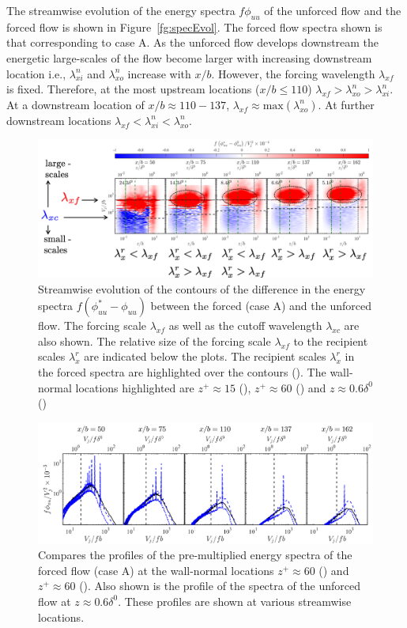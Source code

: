 The streamwise evolution of the energy spectra $f\phi_{uu}$ of the unforced flow and the forced flow is shown in Figure~\ref{fg:specEvol}. The forced flow spectra shown is that corresponding to case A. As the unforced flow develops downstream the energetic large-scales of the flow become larger with increasing downstream location i.e., $\lambda_{xi}^n$ and $\lambda_{xo}^n$ increase with $x/b$. However, the forcing wavelength $\lambda_{xf}$ is fixed. Therefore, at the most upstream locations ($x/b\leq 110$) $\lambda_{xf}>\lambda_{xo}^n>\lambda_{xi}^n$. At a downstream location of $x/b\approx 110-137$, $\lambda_{xf}\approx \mathrm{max}\left(\lambda_{xo}^n\right)$. At further downstream locations $\lambda_{xf}<\lambda_{xi}^n<\lambda_{xo}^n$. 

\begin{figure}[h!]
	\centering
	\includegraphics[width=.99\textwidth]{pics/specEvol2.png}
	\caption{Streamwise evolution of the contours of the difference in the energy spectra $f(\phi_{uu}^*-\phi_{uu})$ between the forced (case A) and the unforced flow. The forcing scale $\lambda_{xf}$ as well as the cutoff wavelength $\lambda_{xc}$ are also shown. The relative size of the forcing scale $\lambda_{xf}$ to the recipient scales $\lambda_x^r$ are indicated below the plots. The recipient scales $\lambda_x^r$  in the forced spectra are highlighted over the contours (\dashed). The wall-normal locations highlighted are $z^+\approx 15$ (\textcolor{green}{\chain}), $z^+\approx 60$ (\textcolor{green}{\dashed}) and $z\approx 0.6\delta^0$ (\textcolor{black}{\dotted})}
	\label{fg:specEvol2}
\end{figure}


\begin{figure}[h!]
	\centering
	\includegraphics[width=.99\textwidth]{pics/specEvol4.png}
	\caption{Compares the profiles of the pre-multiplied energy spectra of the forced flow (case A)  at the wall-normal locations $z^+\approx 60$ (\textcolor{blue}{\chain}) and $z^+\approx 60$ (\textcolor{blue}{\dashed}). Also shown is the profile of the spectra of the unforced flow at $z\approx 0.6 \delta^0$. These profiles are shown at various streamwise locations.}
	\label{fg:specEvol4}
\end{figure}

